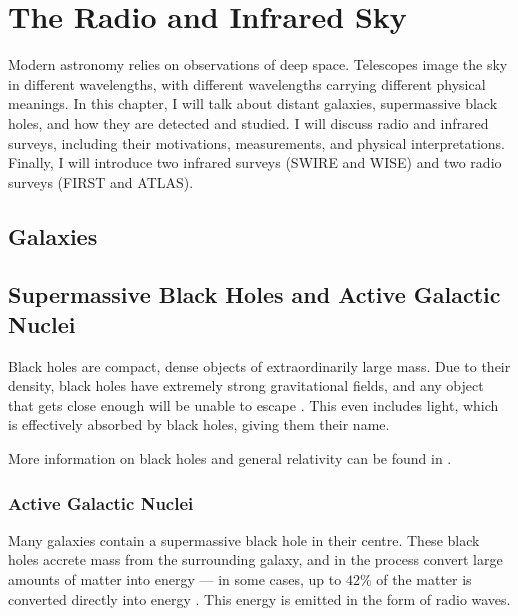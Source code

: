 \chapter{The Radio and Infrared Sky}
\label{cha:astro}

    Modern astronomy relies on observations of deep space. Telescopes image the sky in different wavelengths, with different wavelengths carrying different physical meanings. In this chapter, I will talk about distant galaxies, supermassive black holes, and how they are detected and studied. I will discuss radio and infrared surveys, including their motivations, measurements, and physical interpretations. Finally, I will introduce two infrared surveys (SWIRE and WISE) and two radio surveys (FIRST and ATLAS).

    \section{Galaxies}



    \section{Supermassive Black Holes and Active Galactic Nuclei}

        Black holes are compact, dense objects of extraordinarily large mass. Due to their density, black holes have extremely strong gravitational fields, and any object that gets close enough will be unable to escape \citep{wald10}. This even includes light, which is effectively absorbed by black holes, giving them their name.


            More information on black holes and general relativity can be found in \citet{wald10}.


        \subsection{Active Galactic Nuclei}

            Many galaxies contain a supermassive black hole in their centre. These black holes accrete mass from the surrounding galaxy, and in the process convert large amounts of matter into energy --- in some cases, up to $42\%$ of the matter is converted directly into energy \citep{alexander12}. This energy is emitted in the form of radio waves.



